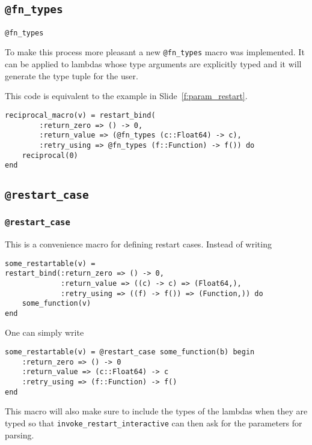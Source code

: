 \documentclass{beamer}
\begin{document}
\subsection{\texttt{@fn\_types}}
\begin{frame}[fragile]{\texttt{@fn\_types}}
   \begin{block}{}
   To make this process more pleasant a new \texttt{@fn\_types} macro was implemented.
   It can be applied to lambdas whose type arguments are explicitly typed and it will generate the type tuple
   for the user.
   \end{block}
   \begin{example}
   This code is equivalent to the example in Slide~\ref{f:param_restart}.
   \begin{verbatim}
reciprocal_macro(v) = restart_bind(
        :return_zero => () -> 0,
        :return_value => (@fn_types (c::Float64) -> c),
        :retry_using => @fn_types (f::Function) -> f()) do
    reciprocal(0)
end
   \end{verbatim}
   \end{example}
\end{frame}

\subsection{\texttt{@restart\_case}}

\begin{frame}[fragile]
\frametitle{\texttt{@restart\_case}}
\begin{block}{}
This is a convenience macro for defining restart cases.
Instead of writing
\begin{verbatim}
some_restartable(v) =
restart_bind(:return_zero => () -> 0,
             :return_value => ((c) -> c) => (Float64,),
             :retry_using => ((f) -> f()) => (Function,)) do
    some_function(v)
end
\end{verbatim}
One can simply write
\begin{verbatim}
some_restartable(v) = @restart_case some_function(b) begin
    :return_zero => () -> 0
    :return_value => (c::Float64) -> c
    :retry_using => (f::Function) -> f()
end
\end{verbatim}
This macro will also make sure to include the types of the lambdas when they are typed
so that \texttt{invoke\_restart\_interactive} can then ask for the parameters for
parsing.
\end{block}
\end{frame}
\end{document}
